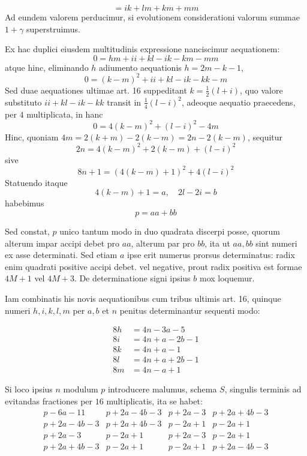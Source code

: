 %
\[
=ik+lm+km+mm
\]
Ad eundem valorem perducimur, si evolutionem considerationi valorum summae $1+\gamma$ superstruimus.

Ex hac duplici eiusdem multitudinis expressione nanciscimur aequationem:
\[
0=hm+ii+kl-ik-km-mm
\]
atque hinc, eliminando $h$ adiumento aequationis $h=2m-k-1$,
\[
0=(k-m)^2+ii+kl-ik-kk-m
\]
Sed duae aequationes ultimae art. 16 suppeditant $k=\frac12(l+i)$, quo valore substituto $ii+kl-ik-kk$ transit in $\frac14(l-i)^2$, adeoque aequatio praecedens, per $4$ multiplicata, in hanc
\[
0=4(k-m)^2+(l-i)^2-4m
\]
Hinc, quoniam $4m=2(k+m)-2(k-m)=2n-2(k-m)$, sequitur
\[
2n=4(k-m)^2+2(k-m)+(l-i)^2
\]
sive
\[
8n+1=(4(k-m)+1)^2+4(l-i)^2
\]
Statuendo itaque
\[
4(k-m)+1=a,\quad2l-2i=b
\]
habebimus
\[
p=aa+bb
\]

Sed constat, $p$ unico tantum modo in duo quadrata discerpi posse, quorum alterum impar accipi debet pro $aa$, alterum par pro $bb$, ita ut $aa,bb$ sint numeri ex asse determinati. Sed etiam $a$ ipse erit numerus prorsus determinatus: radix enim quadrati positive accipi debet. vel negative, prout radix positiva est formae $4M+1$ vel $4M+3$. De determinatione signi ipsius $b$ mox loquemur.

Iam combinatis his novis aequationibus cum tribus ultimis art. 16, quinque numeri $h,i,k,l,m$ per $a,b$ et $n$ penitus determinantur sequenti modo:

%
\[
\begin{aligned}
8h&=4n-3a-5\\
8i&=4n+a-2b-1\\
8k&=4n+a-1\\
8l&=4n+a+2b-1\\
8m&=4n-a+1
\end{aligned}
\]

Si loco ipsius $n$ modulum $p$ introducere malumus, schema $S$, singulis terminis ad evitandas fractiones per $16$ multiplicatis, ita se habet:
\[
\begin{array}{l|l|l|l}
p-6a-11&p+2a-4b-3&p+2a-3&p+2a+4b-3\\
p+2a-4b-3&p+2a+4b-3&p-2a+1&p-2a+1\\
p+2a-3&p-2a+1&p+2a-3&p-2a+1\\
p+2a+4b-3&p-2a+1&p-2a+1&p+2a-4b-3
\end{array}
\]

